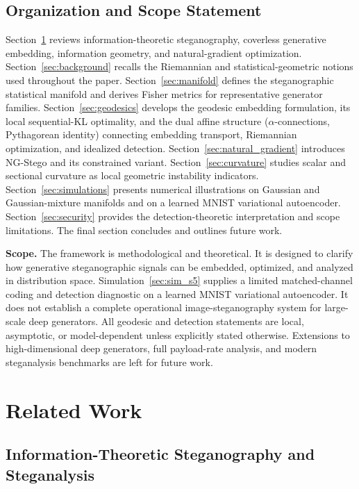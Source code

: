 \documentclass[a4paper,fleqn]{cas-dc}
\begin{document}
\subsection{Organization and Scope Statement}

Section~\ref{sec:related} reviews information-theoretic steganography,
coverless generative embedding, information geometry, and natural-gradient
optimization.
Section~\ref{sec:background} recalls the Riemannian and statistical-geometric
notions used throughout the paper.
Section~\ref{sec:manifold} defines the steganographic statistical manifold and
derives Fisher metrics for representative generator families.
Section~\ref{sec:geodesics} develops the geodesic embedding formulation,
its local sequential-KL optimality, and the dual affine structure
($\alpha$-connections, Pythagorean identity) connecting embedding transport,
Riemannian optimization, and idealized detection.
Section~\ref{sec:natural_gradient} introduces NG-Stego and its constrained variant.
Section~\ref{sec:curvature} studies scalar and sectional curvature as local
geometric instability indicators.
Section~\ref{sec:simulations} presents numerical illustrations on Gaussian and
Gaussian-mixture manifolds and on a learned MNIST variational autoencoder.
Section~\ref{sec:security} provides the detection-theoretic interpretation and
scope limitations.
The final section concludes and outlines future work.

\noindent\textbf{Scope.}
The framework is methodological and theoretical.
It is designed to clarify how generative steganographic signals can be
embedded, optimized, and analyzed in distribution space.
Simulation~\ref{sec:sim_s5} supplies a limited matched-channel coding and
detection diagnostic on a learned MNIST variational autoencoder. It does not
establish a complete operational image-steganography system for large-scale
deep generators.
All geodesic and detection statements are local, asymptotic, or model-dependent
unless explicitly stated otherwise.
Extensions to high-dimensional deep generators, full payload-rate analysis,
and modern steganalysis benchmarks are left for future work.

\section{Related Work}
\label{sec:related}

\subsection{Information-Theoretic Steganography and Steganalysis}
\end{document}
